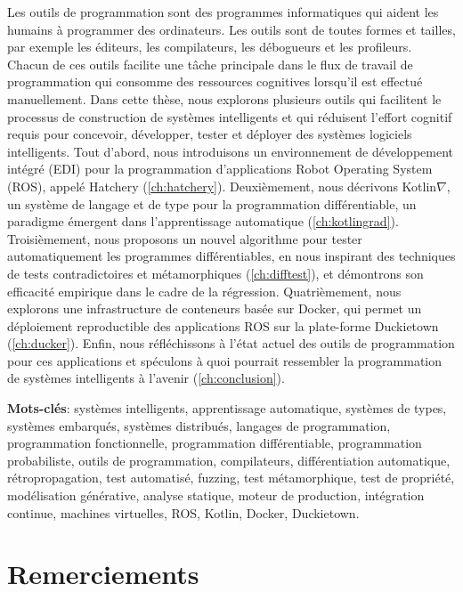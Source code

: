 \vspace{-40pt} Les outils de programmation sont des programmes informatiques qui aident les humains à programmer des ordinateurs. Les outils sont de toutes formes et tailles, par exemple les éditeurs, les compilateurs, les débogueurs et les profileurs. Chacun de ces outils facilite une tâche principale dans le flux de travail de programmation qui consomme des ressources cognitives lorsqu'il est effectué manuellement. Dans cette thèse, nous explorons plusieurs outils qui facilitent le processus de construction de systèmes intelligents et qui réduisent l'effort cognitif requis pour concevoir, développer, tester et déployer des systèmes logiciels intelligents. Tout d'abord, nous introduisons un environnement de développement intégré (EDI) pour la programmation d'applications Robot Operating System (ROS), appelé Hatchery (\autoref{ch:hatchery}). Deuxièmement, nous décrivons Kotlin$\nabla$, un système de langage et de type pour la programmation différentiable, un paradigme émergent dans l'apprentissage automatique (\autoref{ch:kotlingrad}). Troisièmement, nous proposons un nouvel algorithme pour tester automatiquement les programmes différentiables, en nous inspirant des techniques de tests contradictoires et métamorphiques (\autoref{ch:difftest}), et démontrons son efficacité empirique dans le cadre de la régression. Quatrièmement, nous explorons une infrastructure de conteneurs basée sur Docker, qui permet un déploiement reproductible des applications ROS sur la plate-forme Duckietown (\autoref{ch:ducker}). Enfin, nous réfléchissons à l'état actuel des outils de programmation pour ces applications et spéculons à quoi pourrait ressembler la programmation de systèmes intelligents à l'avenir (\autoref{ch:conclusion}).

\noindent\textbf{Mots-clés}: systèmes intelligents, apprentissage automatique, systèmes de types, systèmes embarqués, systèmes distribués, langages de programmation, programmation fonctionnelle, programmation différentiable, programmation probabiliste, outils de programmation, compilateurs, différentiation automatique, rétropropagation, test automatisé, fuzzing, test métamorphique, test de propriété, modélisation générative, analyse statique, moteur de production, intégration continue, machines virtuelles, ROS, Kotlin, Docker, Duckietown.

\chapter*{Remerciements}

